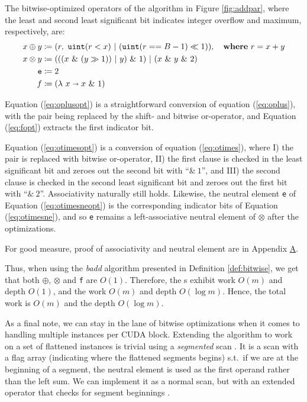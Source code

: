 \begin{definition}\label{def:bitwise}
  The bitwise-optimized operators of the algorithm in Figure \ref{fig:addpar},
  where the least and second least significant bit indicates integer overflow
  and maximum, respectively, are:
\begin{align}
  \label{eq:oplusopt}
  x \oplus y &\coloneq (r,~\mathtt{uint}(r < x)~|~(\mathtt{uint}(r == B-1) \ll 1)),\quad\textbf{where}~r = x + y \\
  \label{eq:otimesopt}
  x \otimes y &\coloneq (((x~\&~(y \gg 1))~|~y)~\&~1)~|~(x~\&~y~\&~2)\\
  \label{eq:otimesneopt}
  \mathtt{e} &\coloneq 2\\
  \label{eq:fopt}
  f &\coloneq (\lambda~x \shortrightarrow x~\&~1)
\end{align}
\end{definition}

Equation (\ref{eq:oplusopt}) is a straightforward conversion of equation
(\ref{eq:oplus}), with the pair being replaced by the shift- and bitwise
or-operator, and Equation (\ref{eq:fopt}) extracts the first indicator bit.

Equation (\ref{eq:otimesopt}) is a conversion of equation (\ref{eq:otimes}),
where I) the pair is replaced with bitwise or-operator, II) the first clause is
checked in the least significant bit and zeroes out the second bit with
``$\&~1$'', and III) the second clause is checked in the second least
significant bit and zeroes out the first bit with ``$\&~2$''. Associativity
naturally still holds. Likewise, the neutral element \texttt{e} of Equation
(\ref{eq:otimesneopt}) is the corresponding indicator bits of Equation
(\ref{eq:otimesne}), and so \texttt{e} remains a left-associative neutral
element of $\otimes$ after the optimizations.

For good measure, proof of associativity and neutral element are in Appendix
\hyperref[app:A]{A}.

Thus, when using the \textit{badd} algorithm presented in Definition
\ref{def:bitwise}, we get that both $\oplus$, $\otimes$ and \texttt{f} are
$O(1)$. Therefore, the s exhibit work $O(m)$ and depth $O(1)$, and the
 work $O(m)$ and depth $O(\log m)$. Hence, the total work is $O(m)$ and
the depth $O(\log m)$.
\bigskip

As a final note, we can stay in the lane of bitwise optimizations when it comes
to handling multiple instances per CUDA block. Extending the algorithm to work
on a set of flattened instances is trivial using a \textit{segmented} scan
\cite{blellochaddscan}. It is a scan with a flag array (indicating where the
flattened segments begins) s.t.\ if we are at the beginning of a segment, the
neutral element is used as the first operand rather than the left sum.  We can
implement it as a normal scan, but with an extended operator that checks for
segment beginnings \cite{ParallelProgrammingInFuthark}.

